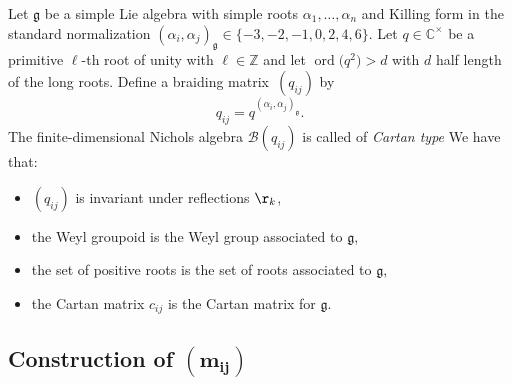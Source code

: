 \documentclass[pdftex]{sigma}%
\numberwithin{equation}{section}
\newcommand{\Z}{\mathbb{Z}}
\newcommand{\C}{\mathbb{C}}
\begin{document}
Let $\mathfrak{g}$ be a simple Lie algebra with simple roots $\alpha_1, \dots, \alpha_n$ and Killing form in the standard normalization $(\alpha_{i}, \alpha_{j})_\mathfrak{g} \in \{-3, -2, -1, 0, 2, 4, 6\}$. Let $q \in \C^\times$ be a primitive $\ell$-th root of unity with $\ell \in \Z$ and let $\operatorname{ord}\big(q^2\big) >d$ with $d$ half length of the long roots. Define a braiding mat\-rix~$(q_{ij})$ by
\[q_{ij} =q^{(\alpha_{i}, \alpha_{j})_\mathfrak{g}}.\]
The finite-dimensional Nichols algebra $\mathcal{B}(q_{ij})$ \cite{AS10, Lusz93, Rosso98} is called of \emph{Cartan type} We have that:
\begin{itemize}\itemsep=0pt
	\item $(q_{ij})$ is invariant under reflections $\r_k$,
	\item the Weyl groupoid is the Weyl group associated to $\mathfrak{g}$,
	\item the set of positive roots is the set of roots associated to $\mathfrak{g}$,
	\item the Cartan matrix $c_{ij}$ is the Cartan matrix for $\mathfrak{g}$.
\end{itemize}

\subsection[Construction of $(m_{ij})$]{Construction of $\boldsymbol{(m_{ij})}$}
\end{document}
